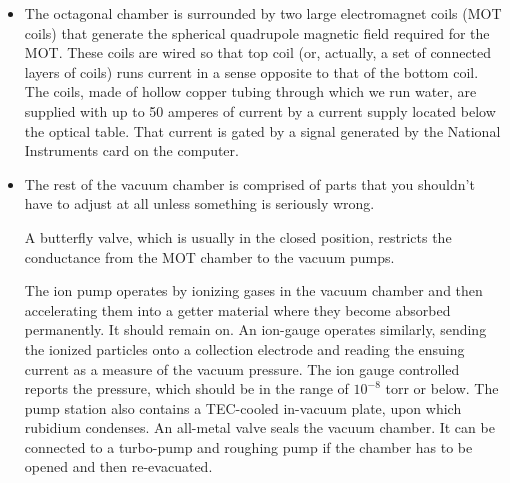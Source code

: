 \documentclass{../lab}
\begin{document}
\begin{itemize}

    \item The octagonal chamber is surrounded by two large electromagnet coils (MOT coils) that generate the spherical quadrupole magnetic field required for the MOT. These coils are wired so that top coil (or, actually, a set of connected layers of coils) runs current in a sense opposite to that of the bottom coil. The coils, made of hollow copper tubing through which we run water, are supplied with up to 50 amperes of current by a current supply located below the optical table.  That current is gated by a signal generated by the National Instruments card on the computer. 
    
    
    \item The rest of the vacuum chamber is comprised of parts that you shouldn't have to adjust at all unless something is seriously wrong.
    
    A butterfly valve, which is usually in the closed position, restricts the conductance from the MOT chamber to the vacuum pumps.
    
    The ion pump operates by ionizing gases in the vacuum chamber and then accelerating them into a getter material where they become absorbed permanently.  It should remain on.  An ion-gauge operates similarly, sending the ionized particles onto a collection electrode and reading the ensuing current as a measure of the vacuum pressure.  The ion gauge controlled reports the pressure, which should be in the range of $10^{-8}$ torr or below.  The pump station also contains a TEC-cooled in-vacuum plate, upon which rubidium condenses.  An all-metal valve seals the vacuum chamber.  It can be connected to a turbo-pump and roughing pump if the chamber has to be opened and then re-evacuated.
    

\end{itemize}
\end{document}
